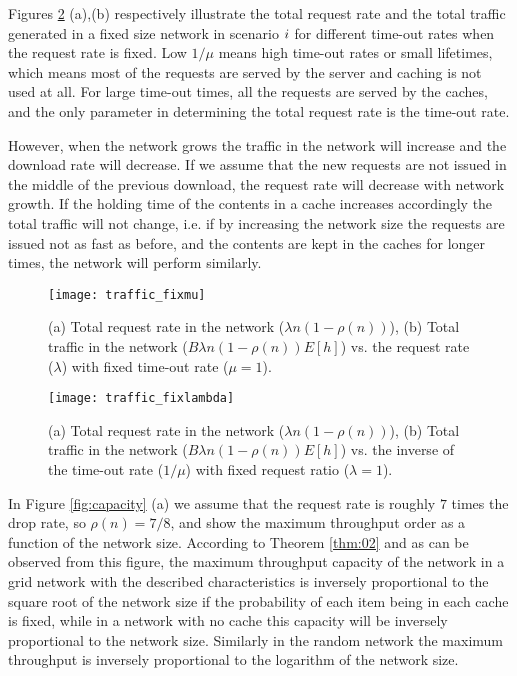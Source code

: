 \documentclass[journal]{IEEEtran}
\theoremstyle{plain}
\theoremstyle{remark}
\begin{document}
Figures \ref{fig:traffic_mu} (a),(b) respectively illustrate the total request rate and the total traffic generated in a fixed size network in scenario $\romannumeral 1$ for different time-out rates when the request rate is fixed. Low $1/\mu$ means high time-out rates or small lifetimes, which means most of the requests are served by the server and caching is not used at all. For large time-out times, all the requests are served by the caches, and the only parameter in determining the total request rate is the time-out rate.

However, when the network grows the traffic in the network will increase and the download rate will decrease. If we assume that the new requests are not issued in the middle of the previous download, the request rate will decrease with network growth. If the holding time of the contents in a cache increases accordingly the total traffic will not change, i.e. if by increasing the network size the requests are issued not as fast as before, and the contents are kept in the caches for longer times, the network will perform similarly.


\begin{figure}[http]
    \center
			\texttt{[image: traffic\_fixmu]}\\
      \caption{(a) Total request rate in the network ($\lambda n (1-\rho(n))$), (b) Total traffic in the network ($B\lambda n (1-\rho(n))E[h]$) vs. the request rate ($\lambda$) with fixed time-out rate ($\mu=1$).}
    \label{fig:traffic_lambda}
\end{figure}

\begin{figure}[http]
    \center
			\texttt{[image: traffic\_fixlambda]}\\
      \caption{(a) Total request rate in the network ($\lambda n (1-\rho(n))$), (b) Total traffic in the network ($B\lambda n (1-\rho(n))E[h]$) vs. the inverse of the time-out rate ($1/\mu$) with fixed request ratio ($\lambda=1$).}
    \label{fig:traffic_mu}
\end{figure}

In Figure \ref{fig:capacity} (a) we assume that the request rate is roughly $7$ times the drop rate, so $\rho(n)=7/8$, and show the maximum throughput order as a function of the network size. According to Theorem \ref{thm:02} and as can be observed from this figure, the maximum throughput capacity of the network in a grid network with the described characteristics is inversely proportional to the square root of the network size if the probability of each item being in each cache is fixed, while in a network with no cache this capacity will be inversely proportional to the network size. Similarly in the random network the maximum throughput is inversely proportional to the logarithm of the network size. 
\end{document}
